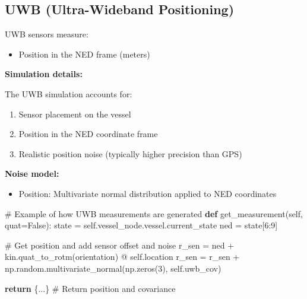 \documentclass[
  letterpaper,
  DIV=11,
  numbers=noendperiod]{scrreprt}
\newenvironment{Shaded}{\begin{snugshade}}{\end{snugshade}}
\newcommand{\CommentTok}[1]{\textcolor[rgb]{0.37,0.37,0.37}{#1}}
\newcommand{\ControlFlowTok}[1]{\textcolor[rgb]{0.00,0.23,0.31}{\textbf{#1}}}
\newcommand{\DecValTok}[1]{\textcolor[rgb]{0.68,0.00,0.00}{#1}}
\newcommand{\KeywordTok}[1]{\textcolor[rgb]{0.00,0.23,0.31}{\textbf{#1}}}
\newcommand{\NormalTok}[1]{\textcolor[rgb]{0.00,0.23,0.31}{#1}}
\newcommand{\OperatorTok}[1]{\textcolor[rgb]{0.37,0.37,0.37}{#1}}
\newcommand{\VariableTok}[1]{\textcolor[rgb]{0.07,0.07,0.07}{#1}}
\providecommand{\tightlist}{%
  \setlength{\itemsep}{0pt}\setlength{\parskip}{0pt}}\usepackage{longtable,booktabs,array}
\begin{document}
\subsection*{UWB (Ultra-Wideband
Positioning)}\label{uwb-ultra-wideband-positioning}

UWB sensors measure:

\begin{itemize}
\tightlist
\item
  Position in the NED frame (meters)
\end{itemize}

\textbf{Simulation details:}

The UWB simulation accounts for:

\begin{enumerate}
\def\labelenumi{\arabic{enumi}.}
\tightlist
\item
  Sensor placement on the vessel
\item
  Position in the NED coordinate frame
\item
  Realistic position noise (typically higher precision than GPS)
\end{enumerate}

\textbf{Noise model:}

\begin{itemize}
\tightlist
\item
  Position: Multivariate normal distribution applied to NED coordinates
\end{itemize}

\begin{Shaded}
\begin{Highlighting}[]
\CommentTok{\# Example of how UWB measurements are generated}
\KeywordTok{def}\NormalTok{ get\_measurement(}\VariableTok{self}\NormalTok{, quat}\OperatorTok{=}\VariableTok{False}\NormalTok{):}
\NormalTok{    state }\OperatorTok{=} \VariableTok{self}\NormalTok{.vessel\_node.vessel.current\_state}
\NormalTok{    ned }\OperatorTok{=}\NormalTok{ state[}\DecValTok{6}\NormalTok{:}\DecValTok{9}\NormalTok{]}
    
    \CommentTok{\# Get position and add sensor offset and noise}
\NormalTok{    r\_sen }\OperatorTok{=}\NormalTok{ ned }\OperatorTok{+}\NormalTok{ kin.quat\_to\_rotm(orientation) }\OperatorTok{@} \VariableTok{self}\NormalTok{.location}
\NormalTok{    r\_sen }\OperatorTok{=}\NormalTok{ r\_sen }\OperatorTok{+}\NormalTok{ np.random.multivariate\_normal(np.zeros(}\DecValTok{3}\NormalTok{), }\VariableTok{self}\NormalTok{.uwb\_cov)}

    \ControlFlowTok{return}\NormalTok{ \{...\}  }\CommentTok{\# Return position and covariance}
\end{Highlighting}
\end{Shaded}
\end{document}
